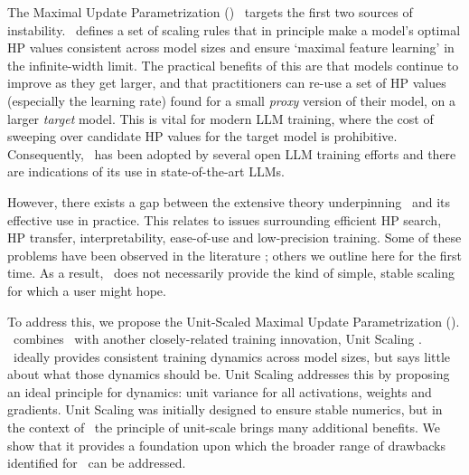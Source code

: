 
The Maximal Update Parametrization (\mup)~\citep{Tensor_Programs_IV,Tensor_Programs_V} targets the first two sources of instability. \mup\ defines a set of scaling rules that in principle make a model's optimal HP values consistent across model sizes and ensure `maximal feature learning' in the infinite-width limit. The practical benefits of this are that models continue to improve as they get larger, and that practitioners can re-use a set of HP values (especially the learning rate) found for a small \textit{proxy} version of their model, on a larger \textit{target} model. This is vital for modern LLM training, where the cost of sweeping over candidate HP values for the target model is prohibitive. Consequently, \mup\ has been adopted by several open LLM training efforts \citep{Cerebras_GPT, BTLM, LLM360, MiniCPM} and there are indications of its use in state-of-the-art LLMs\footnotemark.


However, there exists a gap between the extensive theory underpinning \mup\ and its effective use in practice. This relates to issues surrounding efficient HP search, HP transfer, interpretability, ease-of-use and low-precision training. Some of these problems have been observed in the literature \citep{Exploration_Of_Mu_Transfer, Falcon, Tensor_Programs_V}; others we outline here for the first time. As a result, \mup\ does not necessarily provide the kind of simple, stable scaling for which a user might hope. 

To address this, we propose the Unit-Scaled Maximal Update Parametrization (\umup). \umup\ combines \mup\ with another closely-related training innovation, Unit Scaling \citep{Unit_Scaling}. \mup\ ideally provides consistent training dynamics across model sizes, but says little about what those dynamics should be. Unit Scaling addresses this by proposing an ideal principle for dynamics: unit variance for all activations, weights and gradients. Unit Scaling was initially designed to ensure stable numerics, but in the context of \mup\ the principle of unit-scale brings many additional benefits. We show that it provides a foundation upon which the broader range of drawbacks identified for \mup\ can be addressed.

